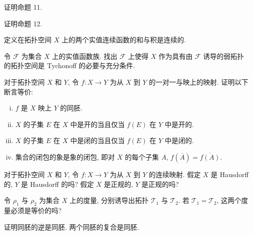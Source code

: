 \documentclass[../../main.tex]{subfiles}
\begin{document}
\begin{exercise}\label{exercise:ch11-26}
证明命题 11.
\end{exercise}

\begin{exercise}\label{exercise:ch11-27}
证明命题 12.
\end{exercise}

\begin{exercise}\label{exercise:ch11-28}
定义在拓扑空间 $X$ 上的两个实值连续函数的和与积是连续的.
\end{exercise}

\begin{exercise}\label{exercise:ch11-29}
令 $\mathcal{F}$ 为集合 $X$ 上的实值函数族. 找出 $\mathcal{F}$ 上使得 $X$ 作为具有由 $\mathcal{F}$ 诱导的弱拓扑的拓扑空间是 Tychonoff 的必要与充分条件.
\end{exercise}

\begin{exercise}\label{exercise:ch11-30}
对于拓扑空间 $X$ 和 $Y$, 令 $f:X\to Y$ 为从 $X$ 到 $Y$ 的一对一与映上的映射. 证明以下断言等价:
\begin{enumerate}[(i)]
\item $f$ 是 $X$ 映上 $Y$ 的同胚.
\item $X$ 的子集 $E$ 在 $X$ 中是开的当且仅当 $f(E)$ 在 $Y$ 中是开的.
\item $X$ 的子集 $E$ 在 $X$ 中是闭的当且仅当 $f(E)$ 在 $Y$ 中是闭的.
\item 集合的闭包的象是象的闭包, 即对 $X$ 的每个子集 $A$, $f(\overline{A})=\overline{f(A)}$.
\end{enumerate}
\end{exercise}

\begin{exercise}\label{exercise:ch11-31}
对于拓扑空间 $X$ 和 $Y$, 令 $f:X\to Y$ 为从 $X$ 到 $Y$ 的连续映射. 假定 $X$ 是 Hausdorff 的, $Y$ 是 Hausdorff 的吗? 假定 $X$ 是正规的, $Y$ 是正规的吗?
\end{exercise}

\begin{exercise}\label{exercise:ch11-32}
令 $\rho_{1}$ 与 $\rho_{2}$ 为集合 $X$ 上的度量, 分别诱导出拓扑 $\mathcal{T}_{1}$ 与 $\mathcal{T}_{2}$. 若 $\mathcal{T}_{1}=\mathcal{T}_{2}$, 这两个度量必须是等价的吗?
\end{exercise}

\begin{exercise}\label{exercise:ch11-33}
证明同胚的逆是同胚. 两个同胚的复合是同胚.
\end{exercise}
\end{document}

